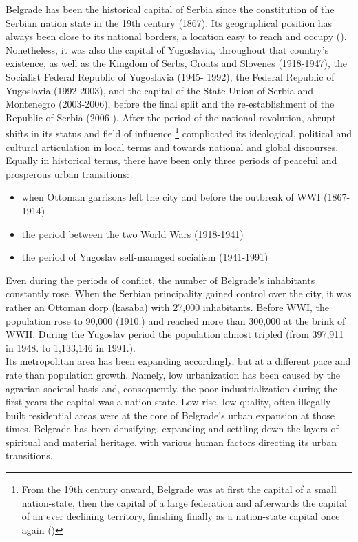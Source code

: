 \documentclass[11pt]{report}
\begin{document}
Belgrade has been the historical capital of Serbia since the constitution of the Serbian nation state in the 19th century (1867). Its geographical position has always been close to its national borders, a location easy to reach and occupy (\href{Doytchinov}{\citealt{doytchinov_capital_2015}}).
Nonetheless, it was also the capital of Yugoslavia, throughout that country’s existence, as well as the Kingdom of Serbs, Croats and Slovenes (1918-1947), the Socialist Federal Republic of Yugoslavia (1945- 1992), the Federal Republic of Yugoslavia (1992-2003), and the capital of the State Union of Serbia and Montenegro (2003-2006), before the final split and the re-establishment of the Republic of Serbia (2006-). After the period of the national revolution, abrupt shifts in its status and field of influence
\footnote{From the 19th century onward, Belgrade was at first the capital of a small nation-state, then the capital of a large federation and afterwards the capital of an ever declining territory, finishing finally as a nation-state capital once again (\href{Hirt}{\citealt{hirt_belgrade_2009}})}
complicated its ideological, political and cultural articulation in local terms and towards national and global discourses.
\\

Equally in historical terms, there have been only three periods of peaceful and prosperous urban transitions:

\begin{itemize}
\item when Ottoman garrisons left the city and before the outbreak of WWI (1867-1914)
\item the period between the two World Wars (1918-1941)
\item  the period of Yugoslav self-managed socialism (1941-1991)
\end{itemize}

Even during the periods of conflict, the number of Belgrade’s inhabitants constantly rose. When the Serbian principality gained control over the city, it was rather an Ottoman dorp (kasaba) with 27,000 inhabitants. Before WWI, the population rose to 90,000 (1910.) and reached more than 300,000 at the brink of WWII. During the Yugoslav period the population almost tripled (from 397,911 in 1948. to 1,133,146 in 1991.).
\\

Its metropolitan area has been expanding accordingly, but at a different pace and rate than population growth. Namely, low urbanization has been caused by the agrarian societal basis and, consequently, the poor industrialization during the first years the capital was a nation-state. Low-rise, low quality, often illegally built residential areas were at the core of Belgrade’s urban expansion at those times. Belgrade has been densifying, expanding and settling down the layers of spiritual and material heritage, with various human factors directing its urban transitions.
\\
\end{document}
